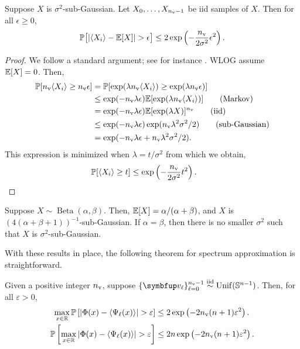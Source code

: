 \begin{lemma}
\label{thm:subgaussian_sum}
Suppose \( X \) is \( \sigma^2 \)-sub-Gaussian.
Let \( X_0, \ldots, X_{n_{\textup{v}}-1} \) be iid samples of \( X \).
Then for all \( \epsilon \geq 0 \),
\begin{align*}
    \mathbb{P}\big[ |\langle X_i \rangle - \mathbb{E}[X] | > \epsilon \big]
    \leq 2 \exp \left( - \frac{n_{\textup{v}}}{2 \sigma^2} \epsilon^2 \right).
\end{align*}
\end{lemma}


\begin{proof}
We follow a standard argument; see for instance \cite{vershynin_18}.
WLOG assume \( \mathbb{E}[X] = 0 \).
Then,
\begin{align*}
    \mathbb{P}[ n_{\textup{v}} \langle X_i \rangle \geq n_{\textup{v}} \epsilon ] 
    &= \mathbb{P}[ \exp( \lambda n_{\textup{v}}\langle X_i \rangle ) \geq \exp(\lambda n_{\textup{v}} \epsilon )]
    \\&\leq \exp(- n_{\textup{v}} \lambda \epsilon) \mathbb{E}[ \exp(\lambda n_{\textup{v}} \langle X_i \rangle) ] \tag{Markov}
    \\&= \exp(- n_{\textup{v}} \lambda \epsilon) \mathbb{E}[ \exp(\lambda X) ]^{n_{\textup{v}}} \tag{iid}
    \\&\leq \exp(- n_{\textup{v}} \lambda \epsilon) \exp( n_{\textup{v}} \lambda^2 \sigma^2 / 2) \tag{sub-Gaussian}
    \\&= \exp(- n_{\textup{v}} \lambda \epsilon + n_{\textup{v}} \lambda^2 \sigma^2 / 2). 
\end{align*}
This expression is minimized when \( \lambda = t / \sigma^2 \) from which we obtain,
\begin{align*}
    \mathbb{P}[ \langle X_i \rangle \geq t] \leq \exp \left( - \frac{n_{\textup{v}}}{2\sigma^2} t^2 \right). \tag*{\qedhere}
\end{align*}
\end{proof}

\begin{theorem}\textup{\cite[Theorem 1]{marchal_arbel_17}}
\label{thm:beta_tails}
Suppose \( X \sim \operatorname{Beta}(\alpha,\beta) \).
Then, \( \mathbb{E}[X] = \alpha / (\alpha + \beta) \), and \( X \) is \( (4(\alpha +\beta + 1))^{-1} \)-sub-Gaussian.
If \( \alpha = \beta \), then there is no smaller \( \sigma^2 \) such that \( X \) is \( \sigma^2 \)-sub-Gaussian.
\end{theorem}

With these results in place, the following theorem for spectrum approximation is straightforward.
\begin{theorem}
\label{thm:CESM_estimator_prob}
Given a positive integer \( n_{\textup{v}} \), suppose \( \{ \vec{v}_{\ell} \}_{\ell=0}^{\nv-1} \stackrel{\textup{iid}}{\sim} \operatorname{Unif}(\mathbb{S}^{n-1}) \).
Then, for all \( \varepsilon > 0 \),
\begin{align*}
    \max_{x\in\mathbb{R}} \mathbb{P}\left[ \left| \Phi(x) - \langle  \Psi_{\ell}(x)  \rangle \right| > \varepsilon \right]
    &\leq
    2 \exp\left( - 2n_{\textup{v}} (n+1) \varepsilon^2 \right).
    \\
    \mathbb{P}\left[ \max_{x\in\mathbb{R}} \left| \Phi(x) - \langle  \Psi_{\ell}(x)  \rangle \right| > \varepsilon \right]
    &\leq
    2 n \exp\left( - 2n_{\textup{v}} (n+1) \varepsilon^2 \right).
\end{align*}
\end{theorem}

